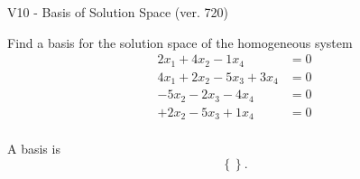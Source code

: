\begin{exercise}
  \begin{exerciseTitle}V10 - Basis of Solution Space (ver. 720)\end{exerciseTitle}
  \begin{exerciseStatement}
    Find a basis for the solution space of the homogeneous system 
\begin{align*}
 2 x_ 1 + 4 x_ 2 -1 x_ 4 &= 0  \\ 
  4 x_ 1 + 2 x_ 2 -5 x_ 3 + 3 x_ 4 &= 0  \\ 
  -5 x_ 2 -2 x_ 3 -4 x_ 4 &= 0  \\ 
  + 2 x_ 2 -5 x_ 3 + 1 x_ 4 &= 0  \\ 
 \end{align*}


 
  \end{exerciseStatement}

  \begin{exerciseAnswer}
   A basis is   
\[\left\{\right\}.\]

  


  \end{exerciseAnswer}
\end{exercise}